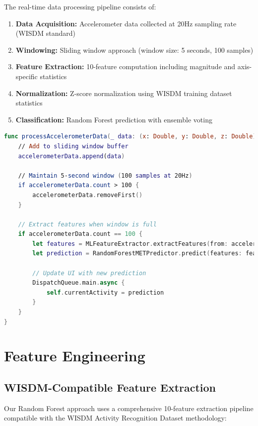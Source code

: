 \documentclass[11pt,a4paper]{article}
\begin{document}
The real-time data processing pipeline consists of:

\begin{enumerate}
    \item \textbf{Data Acquisition:} Accelerometer data collected at 20Hz sampling rate (WISDM standard)
    \item \textbf{Windowing:} Sliding window approach (window size: 5 seconds, 100 samples)
    \item \textbf{Feature Extraction:} 10-feature computation including magnitude and axis-specific statistics
    \item \textbf{Normalization:} Z-score normalization using WISDM training dataset statistics
    \item \textbf{Classification:} Random Forest prediction with ensemble voting
\end{enumerate}

\begin{lstlisting}[language=Swift, caption=iOS Data Processing Implementation]
func processAccelerometerData(_ data: (x: Double, y: Double, z: Double)) {
    // Add to sliding window buffer
    accelerometerData.append(data)
    
    // Maintain 5-second window (100 samples at 20Hz)
    if accelerometerData.count > 100 {
        accelerometerData.removeFirst()
    }
    
    // Extract features when window is full
    if accelerometerData.count == 100 {
        let features = MLFeatureExtractor.extractFeatures(from: accelerometerData)
        let prediction = RandomForestMETPredictor.predict(features: features)
        
        // Update UI with new prediction
        DispatchQueue.main.async {
            self.currentActivity = prediction
        }
    }
}
\end{lstlisting}

\section{Feature Engineering}

\subsection{WISDM-Compatible Feature Extraction}

Our Random Forest approach uses a comprehensive 10-feature extraction pipeline compatible with the WISDM Activity Recognition Dataset methodology:
\end{document}
